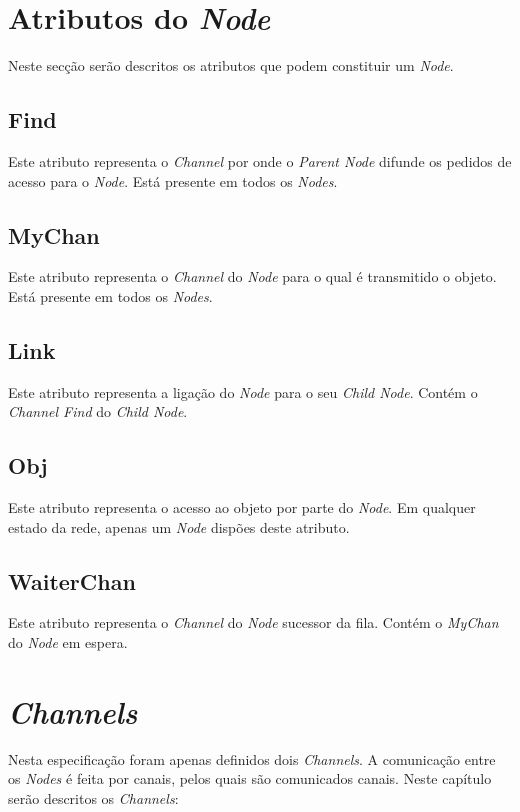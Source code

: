 \section{Atributos do \emph{Node}}
\label{especificacao:atr:section}
Neste secção serão descritos os atributos que podem constituir um \emph{Node}.

\subsection*{Find}
\label{especificacao:atr:find}
    Este atributo representa o \emph{Channel} por onde o \emph{Parent Node} difunde os pedidos de acesso para o \emph{Node}.
    Está presente em todos os \emph{Nodes}.

\subsection*{MyChan}
\label{especificacao:atr:mychan}
    Este atributo representa o \emph{Channel} do \emph{Node} para o qual é transmitido o objeto.
    Está presente em todos os \emph{Nodes}.

\subsection*{Link}
\label{especificacao:atr:link}
    Este atributo representa a ligação do \emph{Node} para o seu \emph{Child Node}.
    Contém o \emph{Channel Find} do \emph{Child Node}.


\subsection*{Obj}
\label{especificacao:atr:obj}
    Este atributo representa o acesso ao objeto por parte do \emph{Node}.
    Em qualquer estado da rede, apenas um \emph{Node} dispões deste atributo.

\subsection*{WaiterChan}
\label{especificacao:atr:waiterchan}
    Este atributo representa o \emph{Channel} do \emph{Node} sucessor da fila.
    Contém o \emph{MyChan} do \emph{Node} em espera.


\section{\emph{Channels}}
\label{especificacao:sec:Channels}
Nesta especificação foram apenas definidos dois \emph{Channels}. A comunicação entre os \emph{Nodes} é feita por canais, pelos quais são comunicados canais.
Neste capítulo serão descritos os \emph{Channels}:


